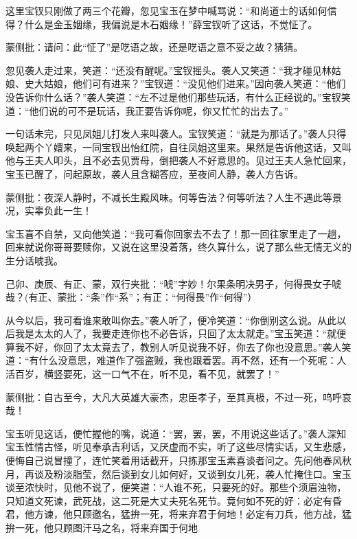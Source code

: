 \begin{parag}
    这里宝钗只刚做了两三个花瓣，忽见宝玉在梦中喊骂说：“和尚道士的话如何信得？什么是金玉姻缘，我偏说是木石姻缘！”薛宝钗听了这话，不觉怔了。\begin{note}蒙侧批：请问：此“怔了”是呓语之故，还是呓语之意不妥之故？猜猜。\end{note}忽见袭人走过来，笑道：“还没有醒呢。”宝钗摇头。袭人又笑道：“我才碰见林姑娘、史大姑娘，他们可有进来？”宝钗道：“没见他们进来。”因向袭人笑道：“他们没告诉你什么话？”袭人笑道：“左不过是他们那些玩话，有什么正经说的。”宝钗笑道：“他们说的可不是玩话，我正要告诉你呢，你又忙忙的出去了。”
\end{parag}


\begin{parag}
    一句话未完，只见凤姐儿打发人来叫袭人。宝钗笑道：“就是为那话了。”袭人只得唤起两个丫嬛来，一同宝钗出怡红院，自往凤姐这里来。果然是告诉他这话，又叫他与王夫人叩头，且不必去见贾母，倒把袭人不好意思的。见过王夫人急忙回来，宝玉已醒了，问起原故，袭人且含糊答应，至夜间人静，袭人方告诉。\begin{note}蒙侧批：夜深人静时，不减长生殿风味。何等告法？何等听法？人生不遇此等景况，实辜负此一生！\end{note}宝玉喜不自禁，又向他笑道：“我可看你回家去不去了！那一回往家里走了一趟，回来就说你哥哥要赎你，又说在这里没着落，终久算什么，说了那么些无情无义的生分话唬我。\begin{note}己卯、庚辰、有正、蒙，双行夹批：“唬”字妙！尔果条明决男子，何得畏女子唬哉？(有正、蒙批：“条”作“系”；有正：“何得畏”作“何得”）\end{note}从今以后，我可看谁来敢叫你去。”袭人听了，便冷笑道：“你倒别这么说。从此以后我是太太的人了，我要走连你也不必告诉，只回了太太就走。”宝玉笑道：“就便算我不好，你回了太太竟去了，教别人听见说我不好，你去了你也没意思。”袭人笑道：“有什么没意思，难道作了强盗贼，我也跟着罢。再不然，还有一个死呢：人活百岁，横竖要死，这一口气不在，听不见，看不见，就罢了！”\begin{note}蒙侧批：自古至今，大凡大英雄大豪杰，忠臣孝子，至其真极，不过一死，呜呼哀哉！\end{note}宝玉听见这话，便忙握他的嘴，说道：“罢，罢，罢，不用说这些话了。”袭人深知宝玉性情古怪，听见奉承吉利话，又厌虚而不实，听了这些尽情实话，又生悲感，便悔自己说冒撞了，连忙笑着用话截开，只拣那宝玉素喜谈者问之。先问他春风秋月，再谈及粉淡脂莹，然后谈到女儿如何好，又谈到女儿死，袭人忙掩住口。宝玉谈至浓快时，见他不说了，便笑道：“人谁不死，只要死的好。那些个须眉浊物，只知道文死谏，武死战，这二死是大丈夫死名死节。竟何如不死的好：必定有昏君，他方谏，他只顾邀名，猛拚一死，将来弃君于何地！必定有刀兵，他方战，猛拚一死，他只顾图汗马之名，将来弃国于何地
\end{parag}
